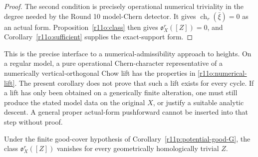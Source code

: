 \begin{proof}
The second condition is precisely operational numerical triviality
in the degree needed by the Round 10 model-Chern detector.
It gives $\operatorname{ch}_r(\bar\xi)=0$ as an actual form.
Proposition~\ref{r11o:class} then gives
$\mathfrak o_X^r([Z])=0$, and
Corollary~\ref{r11o:sufficient} supplies the exact-support form.
\end{proof}

This is the precise interface to a numerical-admissibility approach
to heights.  On a regular model, a pure operational Chern-character
representative of a numerically vertical-orthogonal Chow lift has
the properties in \eqref{r11o:numerical-lift}.  The present
corollary does not prove that such a lift exists for every cycle.
If a lift has only been obtained on a generically finite alteration,
one must still produce the stated model data on the original $X$,
or justify a suitable analytic descent.  A general proper actual-form
pushforward cannot be inserted into that step without proof.

\begin{proposition}
\label{r11o:finite-good-vanishing}
Under the finite good-cover hypothesis of
Corollary~\ref{r11p:potential-good-G}, the class
$\mathfrak o_X^r([Z])$ vanishes for every geometrically
homologically trivial $Z$.
\end{proposition}

